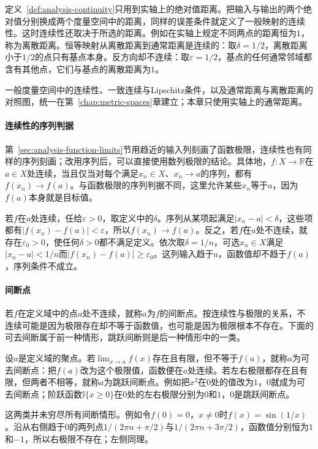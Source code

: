 定义~\ref{def:analysis-continuity}只用到实轴上的绝对值距离。把输入与输出的两个绝对值分别换成两个度量空间中的距离，同样的误差条件就定义了一般映射的连续性。这时连续性还取决于所选的距离。例如在实轴上规定不同两点的距离恒为$1$，称为离散距离。恒等映射从离散距离到通常距离是连续的：取$\delta=1/2$，离散距离小于$1/2$的点只有基点本身。反方向却不连续：取$\varepsilon=1/2$，基点的任何通常邻域都含有其他点，它们与基点的离散距离为$1$。

一般度量空间中的连续性、一致连续与Lipschitz条件，以及通常距离与离散距离的对照图，统一在第~\ref{chap:metric-spaces}章建立；本章只使用实轴上的通常距离。

\paragraph{连续性的序列判据}
第~\ref{sec:analysis-function-limits}节用趋近的输入列刻画了函数极限，连续性也有同样的序列刻画；改用序列后，可以直接使用数列极限的结论。具体地，$f:X\to\mathbb R$在$a\in X$处连续，当且仅当对每个满足$x_n\in X$、$x_n\to a$的序列，都有$f(x_n)\to f(a)$。与函数极限的序列判据不同，这里允许某些$x_n$等于$a$，因为$f(a)$本身就是目标值。

若$f$在$a$处连续，任给$\varepsilon>0$，取定义中的$\delta$。序列从某项起满足$|x_n-a|<\delta$，这些项都有$|f(x_n)-f(a)|<\varepsilon$，所以$f(x_n)\to f(a)$。反之，若$f$在$a$处不连续，就存在$\varepsilon_0>0$，使任何$\delta>0$都不满足定义。依次取$\delta=1/n$，可选$x_n\in X$满足$|x_n-a|<1/n$而$|f(x_n)-f(a)|\geq\varepsilon_0$。这列输入趋于$a$，函数值却不趋于$f(a)$，序列条件不成立。

\paragraph{间断点}
若$f$在定义域中的点$a$处不连续，就称$a$为$f$的间断点。按连续性与极限的关系，不连续可能是因为极限存在却不等于函数值，也可能是因为极限根本不存在。下面的可去间断属于前一种情形，跳跃间断则是后一种情形中的一类。

设$a$是定义域的聚点。若$\lim_{x\to a}f(x)$存在且有限，但不等于$f(a)$，就称$a$为可去间断点：把$f(a)$改为这个极限值，函数便在$a$处连续。若左右极限都存在且有限，但两者不相等，就称$a$为跳跃间断点。例如把$x^2$在$0$处的值改为$1$，$0$就成为可去间断点；阶跃函数$\mathbb I\{x\geq0\}$在$0$处的左右极限分别为$0$和$1$，$0$是跳跃间断点。

这两类并未穷尽所有间断情形。例如令$f(0)=0$，$x\neq0$时$f(x)=\sin(1/x)$。沿从右侧趋于$0$的两列点$1/(2\pi n+\pi/2)$与$1/(2\pi n+3\pi/2)$，函数值分别恒为$1$和$-1$，所以右极限不存在；左侧同理。

